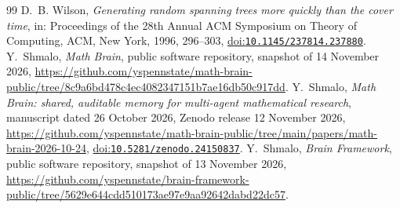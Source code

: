 \documentclass[11pt]{amsart}
\theoremstyle{definition}
\theoremstyle{remark}
\newcommand{\doi}[1]{\href{https://doi.org/#1}{doi:\nolinkurl{#1}}}
\begin{document}
\begin{thebibliography}{99}
 D.~B. Wilson, \emph{Generating random spanning trees more quickly than the cover time}, in:
Proceedings of the 28th Annual ACM Symposium on Theory of Computing, ACM, New York, 1996, 296--303,
\doi{10.1145/237814.237880}.
 Y.~Shmalo, \emph{Math Brain}, public software repository, snapshot of 14 November 2026,
\url{https://github.com/yspennstate/math-brain-public/tree/8c9a6bd478c4ec4082347151b7ae16db50c917dd}.
 Y.~Shmalo, \emph{Math Brain: shared, auditable memory for multi-agent mathematical research},
manuscript dated 26 October 2026, Zenodo release 12 November 2026,
\url{https://github.com/yspennstate/math-brain-public/tree/main/papers/math-brain-2026-10-24},
\doi{10.5281/zenodo.24150837}.
 Y.~Shmalo, \emph{Brain Framework}, public software repository, snapshot of 13 November 2026,
\url{https://github.com/yspennstate/brain-framework-public/tree/5629e644cdd510173ae97e9aa92642dabd22dc57}.
\end{thebibliography}
\end{document}
